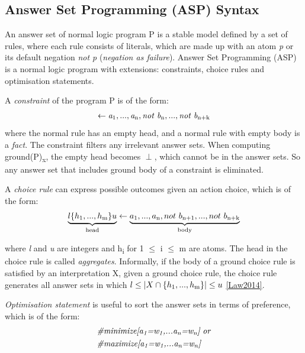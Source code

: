 \documentclass[11pt,twoside]{report}
\theoremstyle{plain}
\theoremstyle{definition}
\begin{document}
\subsection{Answer Set Programming (ASP) Syntax}

An answer set of normal logic program P is a stable model defined by a set of rules, where each rule consists of literals, which are made up with an atom \textit{p} or its default negation \textit{not p} (\textit{negation as failure}). Answer Set Programming (ASP) is a normal logic program with extensions: constraints, choice rules and optimisation statements.

A \textit{constraint} of the program P is of the form:
\begin{equation}
\begin{split}
\leftarrow \textit{a}\textsubscript{1}, ..., \textit{a}\textsubscript{n}, \textit{not b}\textsubscript{n}, ..., \textit{not b}\textsubscript{n+k}
\end{split}
\label{asp_choice_rule}
\end{equation}
where the normal rule has an empty head, and a normal rule  with empty body is a \textit{fact}.
 The constraint filters any irrelevant answer sets. When computing ground(P)\textsubscript{x}, the empty head becomes $\perp$, which cannot be in the answer sets. So any answer set that includes ground body of a constraint is eliminated.

A \textit{choice rule} can express possible outcomes given an action choice, which is of the form:
\begin{equation}
\begin{split}
\underbrace{l\{h\textsubscript{1},...,h\textsubscript{m}\}u}_\text{head} \leftarrow \underbrace{a\textsubscript{1}, ..., a\textsubscript{n}, not\ b\textsubscript{n+1}, ..., not\ b\textsubscript{n+k}}_\text{body}
\end{split}
\label{asp_choice_rule}
\end{equation}

where \textit{l} and \textit{u} are integers and h\textsubscript{i} for 1 $\leq$ i $\leq$ m are atoms. The head in the choice rule is called \textit{aggregates}.
Informally, if the body of a ground choice rule is satisfied by an interpretation X, given a ground choice rule, the choice rule generates all answer sets in which  $l \leq | X \cap \{h\textsubscript{1},...,h\textsubscript{m}\} | \leq u$
\ref{Law2014}.

\textit{Optimisation statement} is useful to sort the answer sets in terms of preference, which is of the form:
\begin{equation}
\begin{split}
&\textit{\#minimize[a\textsubscript{1}=w\textsubscript{1},...a\textsubscript{n}=w\textsubscript{n}]} \ \textit{or} \\
&\textit{\#maximize[a\textsubscript{1}=w\textsubscript{1},...a\textsubscript{n}=w\textsubscript{n}]} \\
\end{split}
\label{asp_optimisation_statement}
\end{equation}
\end{document}
